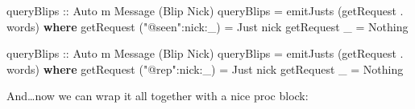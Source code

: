 \documentclass[]{article}
\newenvironment{Shaded}{}{}
\newcommand{\KeywordTok}[1]{\textcolor[rgb]{0.00,0.44,0.13}{\textbf{{#1}}}}
\newcommand{\DataTypeTok}[1]{\textcolor[rgb]{0.56,0.13,0.00}{{#1}}}
\newcommand{\StringTok}[1]{\textcolor[rgb]{0.25,0.44,0.63}{{#1}}}
\newcommand{\OtherTok}[1]{\textcolor[rgb]{0.00,0.44,0.13}{{#1}}}
\newcommand{\FunctionTok}[1]{\textcolor[rgb]{0.02,0.16,0.49}{{#1}}}
\newcommand{\NormalTok}[1]{{#1}}
\begin{document}
\begin{Shaded}
\begin{Highlighting}[]
\OtherTok{    queryBlips ::} \DataTypeTok{Auto} \NormalTok{m }\DataTypeTok{Message} \NormalTok{(}\DataTypeTok{Blip} \DataTypeTok{Nick}\NormalTok{)}
    \NormalTok{queryBlips }\FunctionTok{=} \NormalTok{emitJusts (getRequest }\FunctionTok{.} \NormalTok{words)}
      \KeywordTok{where}
        \NormalTok{getRequest (}\StringTok{"@seen"}\FunctionTok{:}\NormalTok{nick}\FunctionTok{:}\NormalTok{_) }\FunctionTok{=} \DataTypeTok{Just} \NormalTok{nick}
        \NormalTok{getRequest _                }\FunctionTok{=} \DataTypeTok{Nothing}



\OtherTok{queryBlips ::} \DataTypeTok{Auto} \NormalTok{m }\DataTypeTok{Message} \NormalTok{(}\DataTypeTok{Blip} \DataTypeTok{Nick}\NormalTok{)}
\NormalTok{queryBlips }\FunctionTok{=} \NormalTok{emitJusts (getRequest }\FunctionTok{.} \NormalTok{words)}
  \KeywordTok{where}
    \NormalTok{getRequest (}\StringTok{"@rep"}\FunctionTok{:}\NormalTok{nick}\FunctionTok{:}\NormalTok{_) }\FunctionTok{=} \DataTypeTok{Just} \NormalTok{nick}
    \NormalTok{getRequest _                }\FunctionTok{=} \DataTypeTok{Nothing}
\end{Highlighting}
\end{Shaded}

And\ldots{}now we can wrap it all together with a nice proc block:
\end{document}
